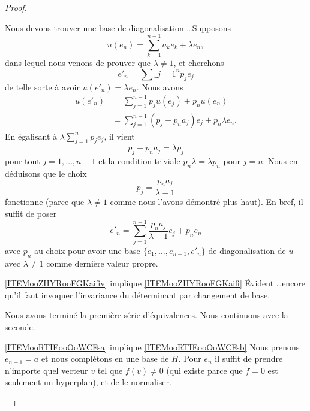 \begin{proof}
\begin{subproof}
        Nous devons trouver une base de diagonalisation \ldots Supposons
        \begin{equation}
            u(e_n)=\sum_{k=1}^{n-1}a_ke_k+\lambda e_n,
        \end{equation}
        dans lequel nous venons de prouver que \( \lambda\neq 1\), et cherchons
        \begin{equation}
            e'_n=\sum\_{j=1}^np_je_j
        \end{equation}
        de telle sorte à avoir \( u(e'_n)=\lambda e_n\). Nous avons
        \begin{subequations}
            \begin{align}
                u(e'_n)&=\sum_{j=1}^{n-1}p_ju(e_j)+p_nu(e_n)\\
                &=\sum_{j=1}^{n-1}(p_j+p_na_j)e_j+p_n\lambda e_n.
            \end{align}
        \end{subequations}
        En égalisant à \( \lambda\sum_{j=1}^np_je_j\), il vient
        \begin{equation}
            p_j+p_na_j=\lambda p_j
        \end{equation}
        pour tout \( j=1,\ldots, n-1\) et la condition triviale \( p_n\lambda=\lambda p_n\) pour \( j=n\). Nous en déduisons que le choix
        \begin{equation}
            p_j=\frac{ p_na_j }{ \lambda-1 }
        \end{equation}
        fonctionne (parce que \( \lambda\neq 1\) comme nous l'avons démontré plus haut). En bref, il suffit de poser
        \begin{equation}
            e'_n=\sum_{j=1}^{n-1}\frac{ p_na_j }{ \lambda-1 }e_j+p_ne_n
        \end{equation}
        avec \( p_n\) au choix pour avoir une base \( \{ e_1,\ldots, e_{n-1},e'_n \}\) de diagonalisation de \( u\) avec \( \lambda\neq 1\) comme dernière valeur propre.
    \item[\ref{ITEMooZHYRooFGKaifiv} implique \ref{ITEMooZHYRooFGKaifi}] Évident \ldots encore qu'il faut invoquer l'invariance du déterminant par changement de base.
    \end{subproof}
    Nous avons terminé la première série d'équivalences. Nous continuons avec la seconde.
       \begin{subproof}
        \item[\ref{ITEMooRTIEooOoWCFsa} implique \ref{ITEMooRTIEooOoWCFsb}]
            Nous prenons \( e_{n-1}=a\) et nous complétons en une base de \( H\). Pour \( e_n\) il suffit de prendre n'importe quel vecteur \( v\) tel que \( f(v)\neq 0\) (qui existe parce que \( f=0\) est seulement un hyperplan), et de le normaliser.


\end{subproof}
\end{proof}
